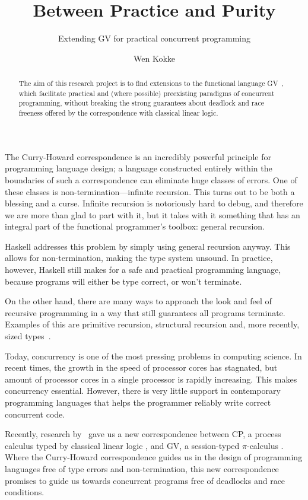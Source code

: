 \documentclass{scrartcl}
\title{Between Practice and Purity}
\subtitle{Extending GV for practical concurrent programming}
\author{Wen Kokke}
\begin{document}
\maketitle

\begin{abstract}
  The aim of this research project is to find extensions to the
  functional language GV~\citep{wadler2012}, which facilitate practical
  and (where possible) preexisting paradigms of concurrent
  programming, without breaking the strong guarantees about deadlock
  and race freeness offered by the correspondence with classical
  linear logic.
\end{abstract}

\vspace{5ex}

The Curry-Howard correspondence is an incredibly powerful principle
for programming language design; a language constructed entirely
within the boundaries of such a correspondence can eliminate huge
classes of errors.
One of these classes is non-termination---infinite recursion. This
turns out to be both a blessing and a curse. Infinite recursion is
notoriously hard to debug, and therefore we are more than glad to part
with it, but it takes with it something that has an integral part of
the functional programmer's toolbox: general recursion.

Haskell addresses this problem by simply using general recursion
anyway. This allows for non-termination, making the type system
unsound. In practice, however, Haskell still makes for a safe and
practical programming language, because programs will either be type
correct, or won't terminate.

On the other hand, there are many ways to approach the look and feel
of recursive programming in a way that still guarantees all programs
terminate. Examples of this are primitive recursion, structural
recursion and, more recently, sized types~\citep{lee2001}.

\vspace{5mm}

Today, concurrency is one of the most pressing problems in computing
science. In recent times, the growth in the speed of processor cores
has stagnated, but amount of processor cores in a single processor is
rapidly increasing. This makes concurrency essential. However, there
is very little support in contemporary programming languages that
helps the programmer reliably write correct concurrent code.

Recently, research by~\citet{wadler2012,caires2010,gay2009} gave us a
new correspondence between CP, a process calculus typed by classical
linear logic \citep{girard1987}, and GV, a session-typed $\pi$-calculus
\citep{honda1993,milner1992a,milner1992b}.
Where the Curry-Howard correspondence guides us in the design of
programming languages free of type errors and non-termination, this
new correspondence promises to guide us towards concurrent programs
free of deadlocks and race conditions.
\end{document}
